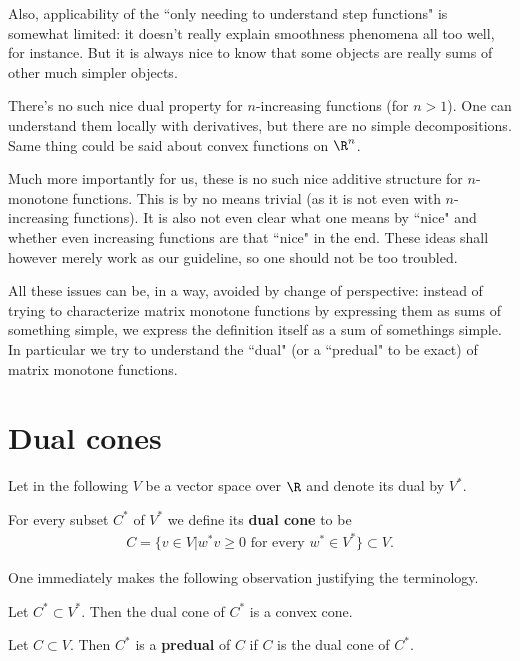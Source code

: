 Also, applicability of the ``only needing to understand step functions" is somewhat limited: it doesn't really explain smoothness phenomena all too well, for instance. But it is always nice to know that some objects are really sums of other much simpler objects.

There's no such nice dual property for $n$-increasing functions (for $n > 1$). One can understand them locally with derivatives, but there are no simple decompositions. Same thing could be said about convex functions on $\R^n$.

Much more importantly for us, these is no such nice additive structure for $n$-monotone functions. This is by no means trivial (as it is not even with $n$-increasing functions). It is also not even clear what one means by ``nice" and whether even increasing functions are that ``nice" in the end. These ideas shall however merely work as our guideline, so one should not be too troubled.

All these issues can be, in a way, avoided by change of perspective: instead of trying to characterize matrix monotone functions by expressing them as sums of something simple, we express the definition itself as a sum of somethings simple. In particular we try to understand the ``dual" (or a ``predual" to be exact) of matrix monotone functions.

\section{Dual cones}

Let in the following $V$ be a vector space over $\R$ and denote its dual by $V^{*}$.

\begin{maar}
	For every subset $C^{*}$ of $V^{*}$ we define its \textbf{dual cone} to be
	\begin{align*}
		C = \{v \in V | w^{*} v \geq 0 \text{ for every $w^{*} \in V^{*}$}\} \subset V.
	\end{align*}
\end{maar}

One immediately makes the following observation justifying the terminology.

\begin{lause}\label{dual_cone}
	Let $C^{*} \subset V^{*}$. Then the dual cone of $C^{*}$ is a convex cone.
\end{lause}

\begin{maar}
	Let $C \subset V$. Then $C^{*}$ is a \textbf{predual} of $C$ if $C$ is the dual cone of $C^{*}$.
\end{maar}

